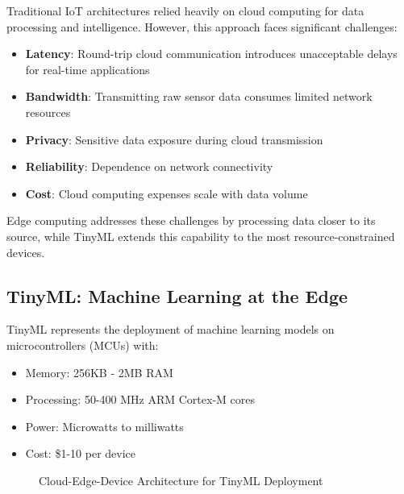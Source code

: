 \documentclass[12pt,a4paper]{article}
\begin{document}
Traditional IoT architectures relied heavily on cloud computing for data processing and intelligence. However, this approach faces significant challenges:
\begin{itemize}[leftmargin=*]
    \item \textbf{Latency}: Round-trip cloud communication introduces unacceptable delays for real-time applications
    \item \textbf{Bandwidth}: Transmitting raw sensor data consumes limited network resources
    \item \textbf{Privacy}: Sensitive data exposure during cloud transmission
    \item \textbf{Reliability}: Dependence on network connectivity
    \item \textbf{Cost}: Cloud computing expenses scale with data volume
\end{itemize}

Edge computing addresses these challenges by processing data closer to its source, while TinyML extends this capability to the most resource-constrained devices.

\subsection{TinyML: Machine Learning at the Edge}

TinyML represents the deployment of machine learning models on microcontrollers (MCUs) with:
\begin{itemize}
    \item Memory: 256KB - 2MB RAM
    \item Processing: 50-400 MHz ARM Cortex-M cores
    \item Power: Microwatts to milliwatts
    \item Cost: \$1-10 per device
\end{itemize}

\begin{figure}[H]
\centering
{}
\caption{Cloud-Edge-Device Architecture for TinyML Deployment}
\end{figure}
\end{document}
